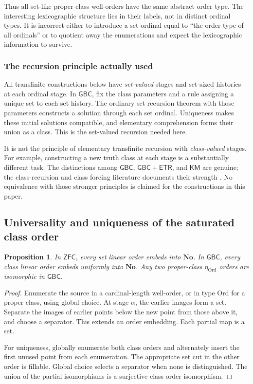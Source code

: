 \documentclass[11pt]{article}
\newtheorem{proposition}[proposition]{Proposition}
\theoremstyle{definition}
\theoremstyle{remark}
\newcommand{\No}{\mathbf{No}}
\newcommand{\Ord}{\mathrm{Ord}}
\newcommand{\GBC}{\mathsf{GBC}}
\newcommand{\ZFC}{\mathsf{ZFC}}
\newcommand{\KM}{\mathsf{KM}}
\newcommand{\ETR}{\mathsf{ETR}}
\begin{document}
Thus all set-like proper-class well-orders have the same abstract order
type. The interesting lexicographic structure lies in their labels,
not in distinct ordinal types. It is incorrect either to introduce a
set ordinal equal to ``the order type of all ordinals'' or to quotient
away the enumerations and expect the lexicographic information to
survive.

\subsubsection{The recursion principle actually used}

All transfinite constructions below have \emph{set-valued} stages and
set-sized histories at each ordinal stage. In $\GBC$, fix the class
parameters and a rule assigning a unique set to each set history.
The ordinary set recursion theorem with those parameters constructs a
solution through each set ordinal. Uniqueness makes these initial
solutions compatible, and elementary comprehension forms their union
as a class. This is the set-valued recursion needed here.

It is not the principle of elementary transfinite recursion with
\emph{class-valued} stages. For example, constructing a new truth class
at each stage is a substantially different task. The distinctions among
$\GBC$, $\GBC+\ETR$, and $\KM$ are genuine; the class-recursion and class
forcing literature documents their strength \cite{HamkinsOpenDet,HamkinsClassForcing}.
No equivalence with those stronger principles is claimed for the
constructions in this paper.

\subsection{Universality and uniqueness of the saturated class order}

\begin{proposition}\label{swo:prop:universal}
In \(\ZFC\), every set linear order embeds into \(\No\). In
\(\GBC\), every class linear order embeds uniformly into \(\No\).
Any two proper-class \(\eta_{\Ord}\) orders are isomorphic in
\(\GBC\).
\end{proposition}
\begin{proof}
Enumerate the source in a cardinal-length well-order, or in type
\(\Ord\) for a proper class, using global choice. At stage \(\alpha\),
the earlier images form a set. Separate the images of earlier points
below the new point from those above it, and choose a separator.
This extends an order embedding. Each partial map is a set.

For uniqueness, globally enumerate both class orders and alternately
insert the first unused point from each enumeration. The appropriate
set cut in the other order is fillable. Global choice selects a
separator when none is distinguished. The union of the partial
isomorphisms is a surjective class order isomorphism.
\end{proof}
\end{document}
